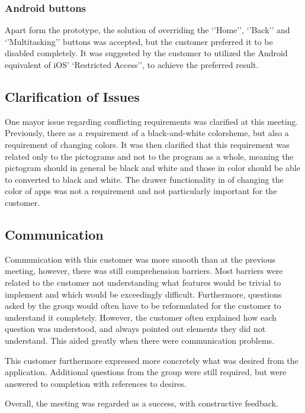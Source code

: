 \subsubsection*{Android buttons}
Apart form the prototype, the solution of overriding the `'Home'', `'Back'' and `'Multitasking'' buttons was accepted, but the customer preferred it to be disabled completely.
It was suggested by the customer to utilized the Android equivalent of iOS' `Restricted Access'', to achieve the preferred result.

\subsection{Clarification of Issues}
One mayor issue regarding conflicting requirements was clarified at this meeting.
Previously, there as a requirement of a black-and-white colorsheme, but also a requirement of changing colors.
It was then clarified that this requirement was related only to the pictograms and not to the program as a whole, meaning the pictogram should in general be black and white and those in color should be able to converted to black and white.
The drawer functionality in \launcher of changing the color of apps was not a requirement and not particularly important for the customer.

\subsection{Communication}
Communication with this customer was more smooth than at the previous meeting, however, there was still comprehension barriers.
Most barriers were related to the customer not understanding what features would be trivial to implement and which would be exceedingly difficult.
Furthermore, questions asked by the group would often have to be reformulated for the customer to understand it completely.
However, the customer often explained how each question was understood, and always pointed out elements they did not understand.
This aided greatly when there were communication problems.

This customer furthermore expressed more concretely what was desired from the application.
Additional questions from the group were still required, but were answered to completion with references to desires.

Overall, the meeting was regarded as a success, with constructive feedback.
